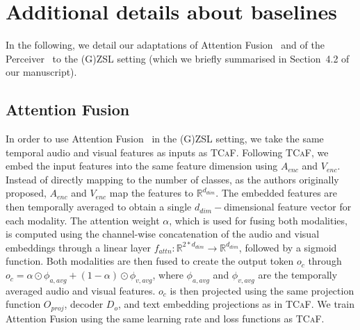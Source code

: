 \documentclass[runningheads]{llncs}
\newcommand{\modelName}{\textsc{TCaF}\xspace}
\begin{document}
\section{Additional details about baselines}
\label{section:baselines_details}
In the following, we detail our adaptations of Attention Fusion~\cite{fayek2020large} and of the Perceiver~\cite{jaegle2021perceiver} to the (G)ZSL setting (which we briefly summarised in Section~4.2 of our manuscript).

\subsection{Attention Fusion}
In order to use Attention Fusion~\cite{fayek2020large} in the (G)ZSL setting, we take the same temporal audio and visual features as inputs as \modelName. Following \modelName, we embed the input features into the same feature dimension using $A_{enc}$ and $V_{enc}$. Instead of directly mapping to the number of classes, as the authors originally proposed, $A_{enc}$ and $V_{enc}$ map the features to $\mathbb{R}^{d_{dim}}$. The embedded features are then temporally averaged to obtain a single $d_{dim}-$dimensional feature vector for each modality. The attention weight $\alpha$, which is used for fusing both modalities, is computed using the channel-wise concatenation of the audio and visual embeddings through a linear layer $f_{attn}:\mathbb{R}^{2*d_{dim}} \rightarrow \mathbb{R}^{d_{dim}}$, followed by a sigmoid function. Both modalities are then fused to create the output token $o_c$ through $o_c = \alpha \odot \phi_{a,avg} + (1-\alpha) \odot \phi_{v,avg}$, where $\phi_{a,avg}$ and $\phi_{v,avg}$ are the temporally averaged audio and visual features. $o_c$ is then projected using the same projection function $O_{proj}$, decoder $D_o$, and text embedding projections as in \modelName. We train Attention Fusion using the same learning rate and loss functions as \modelName.
 
\end{document}
